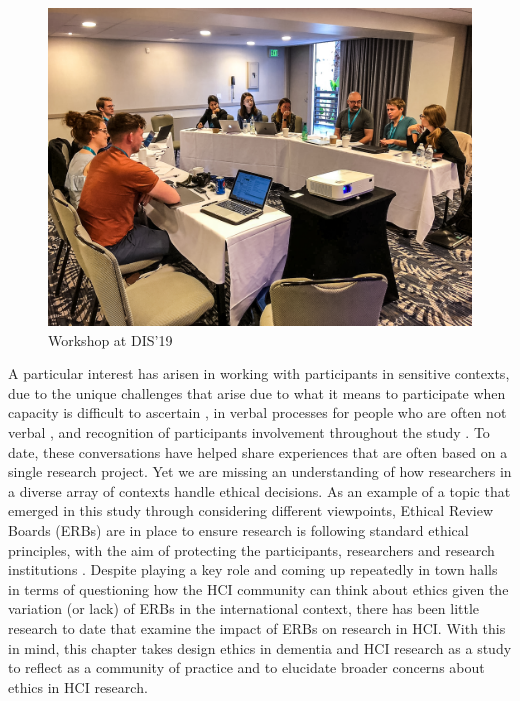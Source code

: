 \begin{figure}[htp]
\centering
\includegraphics[width=.8\linewidth]{Images/ChapterSix/DIS_Workshop.jpg}
\caption{Workshop at DIS'19}
\label{fig:EthicsWorkshop}
\end{figure}

A particular interest has arisen in working with participants in sensitive contexts, due to the unique challenges that arise due to what it means to participate when capacity is difficult to ascertain \citep{foley_printer_2019,lazar_using_2014}, in verbal processes for people who are often not verbal \citep{knapp_nonverbal_2013,kontos_integrating_2018,john_killick_claire_craig_creativity_2012}, and recognition of participants involvement throughout the study \citep{wallace_enabling_2012-1,lindsay_empathy_2012,morrissey_creative_2015}. To date, these conversations have helped share experiences that are often based on a single research project. Yet we are missing an understanding of how researchers in a diverse array of contexts handle ethical decisions. As an example of a topic that emerged in this study through considering different viewpoints, Ethical Review Boards (ERBs) are in place to ensure research is following standard ethical principles, with the aim of protecting the participants, researchers and research institutions \citep{flicker_ethical_2007}. Despite playing a key role and coming up repeatedly in town halls in terms of questioning how the HCI community can think about ethics given the variation (or lack) of ERBs in the international context, there has been little research to date that examine the impact of ERBs on research in HCI. With this in mind, this chapter takes design ethics in dementia and HCI research as a study to reflect as a community of practice and to elucidate broader concerns about ethics in HCI research.


